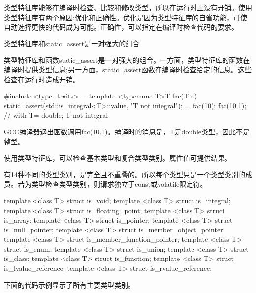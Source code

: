 \href{http://en.cppreference.com/w/cpp/header/type_traits}{类型特征库}能够在编译时检查、比较和修改类型，所以在运行时上没有开销。使用类型特征库有两个原因:优化和正确性。优化是因为类型特征库的自省功能，可使自动选择更快的代码成为可能。正确性，可以指定在编译时检查代码的要求。

\begin{myTip}{类型特征库和static\_assert是一对强大的组合}
	
类型特征库和函数static\_assert是一对强大的组合。一方面，类型特征库的函数在编译时提供类型信息;另一方面，static\_assert函数在编译时检查给定的信息。这些检查在运行时造成开销。

\begin{cpp}
#include <type_traits>
...
template <typename T>T fac(T a){
	static_assert(std::is_integral<T>::value, "T not integral");
	...
}
fac(10);
fac(10.1); // with T= double; T not integral
\end{cpp}

GCC编译器退出函数调用fac(10.1)。编译时的消息是，T是double类型，因此不是整型。
	
\end{myTip}


使用类型特征库，可以检查基本类型和复合类型类别。属性值可提供结果。


有14种不同的类型类别，是完全且不重叠的。所以每个类型只是一个类型类别的成员。若为类型检查类型类别，则请求独立于const或volatile限定符。

\begin{cpp}
template <class T> struct is_void;
template <class T> struct is_integral;
template <class T> struct is_floating_point;
template <class T> struct is_array;
template <class T> struct is_pointer;
template <class T> struct is_null_pointer;
template <class T> struct is_member_object_pointer;
template <class T> struct is_member_function_pointer;
template <class T> struct is_enum;
template <class T> struct is_union;
template <class T> struct is_class;
template <class T> struct is_function;
template <class T> struct is_lvalue_reference;
template <class T> struct is_rvalue_reference;
\end{cpp}

下面的代码示例显示了所有主要类型类别。



